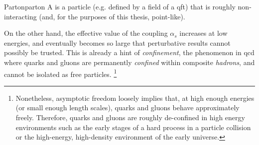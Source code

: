 \begin{definitionbox}{Parton}{parton}
    A  is a particle (e.g. defined by a field of a \gls{qft}) that is roughly non-interacting (and, for the purposes of this thesis, point-like).
\end{definitionbox}



On the other hand, the effective value of the coupling \(\alpha_s\) increases at low energies, and eventually becomes so large that perturbative results cannot possibly be trusted.
%
This is already a hint of \emph{confinement}, the phenomenon in \gls{qcd} where quarks and gluons are permanently \textit{confined} within composite \textit{hadrons}, and cannot be isolated as free particles.%
\footnote{
    Nonetheless, asymptotic freedom loosely implies that, at high enough energies (or small enough length scales), quarks and gluons behave approximately freely.
    Therefore, quarks and gluons are roughly de-confined in high energy environments such as the early stages of a hard process in a particle collision or the high-energy, high-density environment of the early universe.
}

